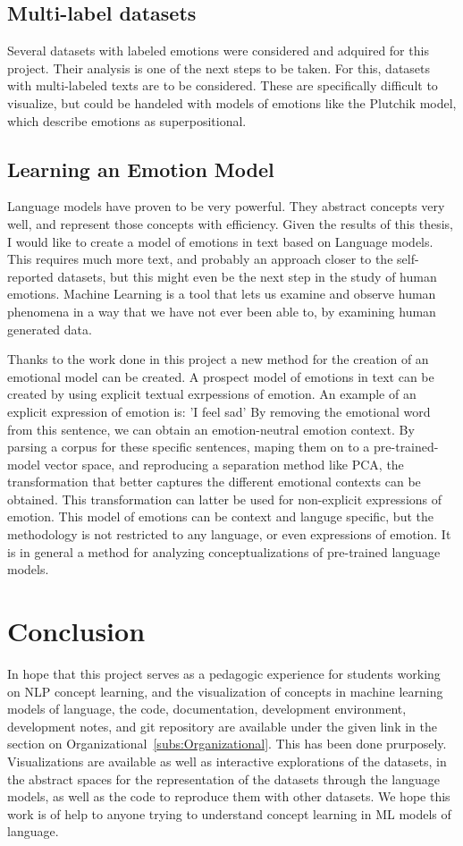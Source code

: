 \subsection{Multi-label datasets}
Several datasets with labeled emotions were considered and adquired for this project. Their analysis is one of the next steps to be taken. For this, datasets with multi-labeled texts are to be considered. These are specifically difficult to visualize, but could be handeled with models of emotions like the Plutchik model, which describe emotions as superpositional.


\subsection{Learning an Emotion Model}
Language models have proven to be very powerful. They abstract concepts very well, and represent those concepts with efficiency. Given the results of this thesis, I would like to create a model of emotions in text based on Language models. This requires much more text, and probably an approach closer to the self-reported datasets, but this might even be the next step in the study of human emotions. Machine Learning is a tool that lets us examine and observe human phenomena in a way that we have not ever been able to, by examining human generated data.

Thanks to the work done in this project a new method for the creation of an emotional model can be created. A prospect model of emotions in text can be created by using explicit textual exrpessions of emotion. An example of an explicit expression of emotion is: 'I feel sad' By removing the emotional word from this sentence, we can obtain an emotion-neutral emotion context. By parsing a corpus for these specific sentences, maping them on to a pre-trained-model vector space, and reproducing a separation method like PCA, the transformation that better captures the different emotional contexts can be obtained. This transformation can latter be used for non-explicit expressions of emotion.
This model of emotions can be context and languge specific, but the methodology is not restricted to any language, or even expressions of emotion. It is in general a method for analyzing conceptualizations of pre-trained language models.

\section{Conclusion}
In hope that this project serves as a pedagogic experience for students working on NLP concept learning, and the visualization of concepts in machine learning models of language, the code, documentation, development environment, development notes, and git repository are available under the given link in the section on Organizational~\ref{subs:Organizational}. This has been done prurposely. Visualizations are available as well as interactive explorations of the datasets, in the abstract spaces for the representation of the datasets through the language models, as well as the code to reproduce them with other datasets. We hope this work is of help to anyone trying to understand concept learning in ML models of language.
